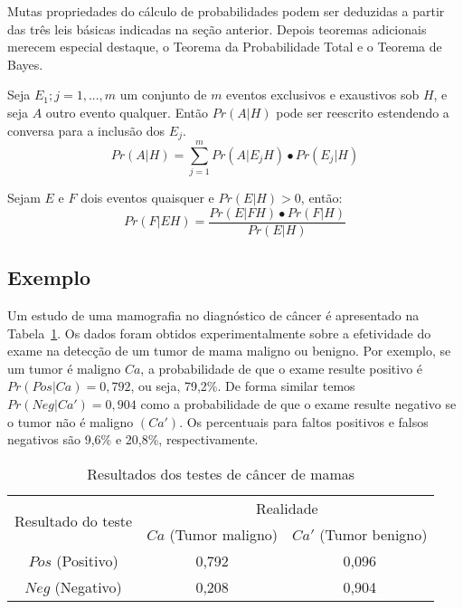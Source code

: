 \documentclass[lnbip]{svmultln}
\begin{document}
Mutas propriedades do cálculo de probabilidades podem ser deduzidas a partir das três leis básicas indicadas na seção anterior. Depois teoremas adicionais merecem especial destaque, o Teorema da Probabilidade Total e o Teorema de Bayes.

\begin{tcolorbox}[colback=blue!5,colframe=blue!75!black,title=Teorema da Probabilidade Total]
    Seja ${E_1; j=1, ..., m}$ um conjunto de $m$ eventos exclusivos e exaustivos sob $H$, e seja $A$ outro evento qualquer. Então $Pr(A|H)$ pode ser reescrito estendendo a conversa para a inclusão dos $E_j$.
    \begin{equation}
        Pr(A|H) = \sum_{j=1}^{m}{Pr(A|E_j H) \bullet Pr(E_j|H)}
    \end{equation}
\end{tcolorbox}

\begin{tcolorbox}[colback=blue!5,colframe=blue!75!black,title=Teorema de Bayes]
    Sejam $E$ e $F$ dois eventos quaisquer e $Pr(E|H)>0$, então:
    \begin{equation}
        Pr(F|E H) = \frac{Pr(E|F H) \bullet Pr(F|H)}{Pr(E|H)}
    \end{equation}
\end{tcolorbox}

\subsection{Exemplo}

Um estudo de uma mamografia no diagnóstico de câncer é apresentado na Tabela~\ref{tab:tab1}. Os dados foram obtidos experimentalmente sobre a efetividade do exame na detecção de um tumor de mama maligno ou benigno. Por exemplo, se um tumor é maligno $Ca$, a probabilidade de que o exame resulte positivo é $Pr(Pos | Ca) = 0,792$, ou seja, 79,2\%. De forma similar temos $Pr(Neg | Ca') = 0,904$ como a probabilidade de que o exame resulte negativo se o tumor não é maligno $(Ca')$. Os percentuais para faltos positivos e falsos negativos são 9,6\% e 20,8\%, respectivamente.


\begin{table}[h]
    \caption{Resultados dos testes de câncer de mamas}
    \label{tab:tab1}
    \center
    \begin{tabular}{ |c|c|c| } 
    \hline
    \multirow{2}{4em}{Resultado do teste} & \multicolumn{2}{|c|}{Realidade} \\
    & $Ca$ (Tumor maligno) & $Ca'$ (Tumor benigno) \\ 
    \hline
    $Pos$ (Positivo) & 0,792 & 0,096 \\ 
    $Neg$ (Negativo) & 0,208 & 0,904 \\ 
    \hline
    \end{tabular}
\end{table}
\end{document}

